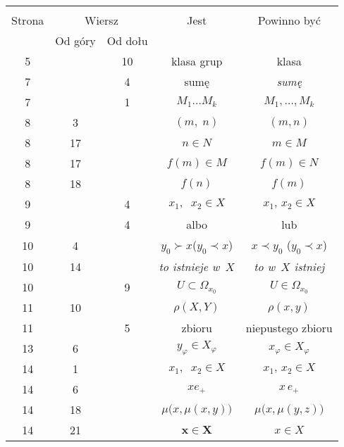 \documentclass[a4paper,11pt]{article}
\begin{document}
\newpage


\vspace{\spaceFive}


\begin{center}

  \begin{tabular}{|c|c|c|c|c|}
    \hline
    & \multicolumn{2}{c|}{} & & \\
    Strona & \multicolumn{2}{c|}{Wiersz} & Jest
                              & Powinno być \\ \cline{2-3}
    & Od góry & Od dołu & & \\
    \hline
    5   & & 10 & klasa grup & klasa \\
    7   & &  4 & sumę & \textit{sumę} \\
    7   & &  1 & $M_{ 1 } \ldots M_{ k }$ & $M_{ 1 }, \ldots, M_{ k }$ \\
    8   &  3 & & $( m,\; n )$ & $( m, n )$ \\
    8   & 17 & & $n \in N$ & $m \in M$ \\
    8   & 17 & & $f( m ) \in M$ & $f( m ) \in N$ \\
    8   & 18 & & $f( n )$ & $f( m )$ \\
    9   & &  4 & $x_{ 1 },\;\; x_{ 2 } \in X$ & $x_{ 1 },\, x_{ 2 } \in X$ \\
    9   & &  4 & albo & lub \\
    10  &  4 & & $y_{ 0 } \succ x$($y_{ 0 } \prec x$)
           & $x \prec y_{ 0 }$ ($y_{ 0 } \prec x$) \\
    10  & 14 & & \textit{to istnieje w~$X$} & \textit{to w~$X$ istniej} \\
    10  & &  9 & $U \subset \Omega_{ x_{ 0 } }$ & $U \in \Omega_{ x_{ 0 } }$ \\
    11  & 10 & & $\rho( X, Y )$ & $\rho( x, y )$ \\
    11  & &  5 & zbioru & niepustego zbioru \\
    13  &  6 & & $y_{ \varphi } \in X_{ \varphi }$ & $x_{ \varphi } \in X_{ \varphi }$ \\
    14  &  1 & & $x_{ 1 },\;\; x_{ 2 } \in X$ & $x_{ 1 },\, x_{ 2 } \in X$ \\
    14  &  6 & & $x e_{ + }$ & $x \, e_{ + }$ \\
    14  & 18 & & $\mu\big( x, \mu( x, y ) \big)$
           & $\mu\big( x, \mu( y, z ) \big)$ \\
    14  & 21 & & $\mathbf{x} \in \mathbf{X}$ & $x \in X$ \\

\end{tabular}
\end{center}
\end{document}
